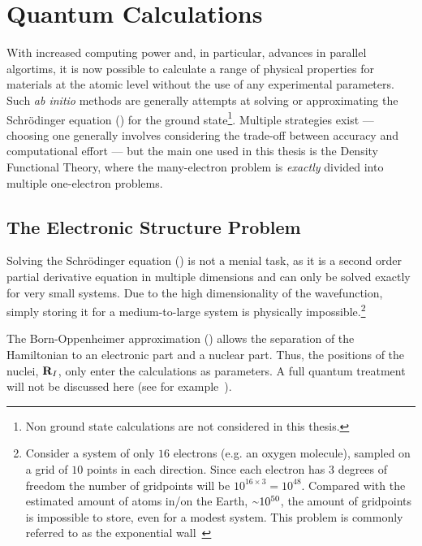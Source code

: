\section{Quantum Calculations}
\label{sec:methods-qm}


With increased computing power and, in particular, advances in parallel algortims, it is now possible to calculate a range of physical properties for materials at the atomic level without the use of any experimental parameters.
Such \textit{ab initio} methods are generally attempts at solving or approximating the Schr\"odinger equation () for the ground state\footnote{Non ground state calculations are not considered in this thesis.}.
Multiple strategies exist --- choosing one generally involves considering the trade-off between accuracy and computational effort --- but the main one used in this thesis is the Density Functional Theory, where the many-electron problem is \emph{exactly} divided into multiple one-electron problems.

\subsection{The Electronic Structure Problem}
Solving the Schr\"odinger equation () is not a menial task, as it is a second order partial derivative equation in multiple dimensions and can only be solved exactly for very small systems.
Due to the high dimensionality of the wavefunction, simply storing it for a medium-to-large system is physically impossible.\footnote{Consider a system of only $16$ electrons (e.g. an oxygen molecule), sampled on a grid of $10$ points in each direction. Since each electron has 3 degrees of freedom the number of gridpoints will be $10^{16\times3} = 10^{48}$. Compared with the estimated amount of atoms in/on the Earth, $\mytilde10^{50}$, the amount of gridpoints is impossible to store, even for a modest system. This problem is commonly referred to as the exponential wall~\cite{kohn-1999}}

The Born-Oppenheimer approximation () allows the separation of the Hamiltonian to an electronic part and a nuclear part.
Thus, the positions of the nuclei, ${\mathrm{\mathbf{\bm{R}}}}_I$, only enter the calculations as parameters.
A full quantum treatment will not be discussed here (see for example~\citemiss).

